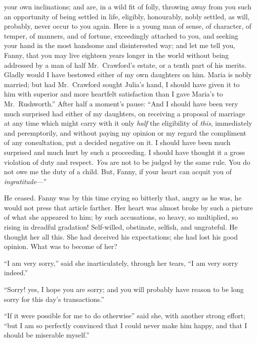 \documentclass{article}
\begin{document}
your own inclinations; and are, in a wild fit of folly,
throwing away from you such an opportunity of being
settled in life, eligibly, honourably, nobly settled,
as will, probably, never occur to you again.  Here is a
young man of sense, of character, of temper, of manners,
and of fortune, exceedingly attached to you, and seeking
your hand in the most handsome and disinterested way;
and let me tell you, Fanny, that you may live eighteen years
longer in the world without being addressed by a man of half
Mr.\ Crawford's estate, or a tenth part of his merits.
Gladly would I have bestowed either of my own daughters
on him.  Maria is nobly married; but had Mr.\ Crawford
sought Julia's hand, I should have given it to him with
superior and more heartfelt satisfaction than I gave
Maria's to Mr.\ Rushworth.''  After half a moment's pause:
``And I should have been very much surprised had either
of my daughters, on receiving a proposal of marriage at any
time which might carry with it only \emph{half} the eligibility
of \emph{this}, immediately and peremptorily, and without paying
my opinion or my regard the compliment of any consultation,
put a decided negative on it.  I should have been much
surprised and much hurt by such a proceeding.  I should
have thought it a gross violation of duty and respect.
\emph{You} are not to be judged by the same rule.  You do not
owe me the duty of a child.  But, Fanny, if your heart
can acquit you of \emph{ingratitude}---''

He ceased.  Fanny was by this time crying so bitterly that,
angry as he was, he would not press that article farther.
Her heart was almost broke by such a picture of what
she appeared to him; by such accusations, so heavy,
so multiplied, so rising in dreadful gradation!
Self-willed, obstinate, selfish, and ungrateful.
He thought her all this.  She had deceived his expectations;
she had lost his good opinion.  What was to become
of her?

``I am very sorry,'' said she inarticulately, through her tears,
``I am very sorry indeed.''

``Sorry! yes, I hope you are sorry; and you will probably
have reason to be long sorry for this day's transactions.''

``If it were possible for me to do otherwise'' said she,
with another strong effort; ``but I am so perfectly
convinced that I could never make him happy, and that I
should be miserable myself.''
\end{document}
